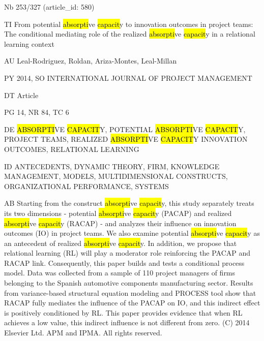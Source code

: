 \documentclass[a4paper]{article}
\begin{document}
\vspace*{-2cm}
Nb \tabto{0cm}253/327 (article\_id: 580)\par
TI \tabto{0cm}From potential \hl{absorpti}ve \hl{capacit}y to innovation outcomes in project teams: The conditional mediating role of the realized \hl{absorpti}ve \hl{capacit}y in a relational learning context\par
AU \tabto{0cm}Leal-Rodriguez, Roldan, Ariza-Montes, Leal-Millan\par
PY \tabto{0cm}2014, SO INTERNATIONAL JOURNAL OF PROJECT MANAGEMENT\par
DT \tabto{0cm}Article\par
PG \tabto{0cm}14, NR 84, TC 6\par
DE \tabto{0cm}\hl{ABSORPTI}VE \hl{CAPACIT}Y, POTENTIAL \hl{ABSORPTI}VE \hl{CAPACIT}Y, PROJECT TEAMS, REALIZED \hl{ABSORPTI}VE \hl{CAPACIT}Y INNOVATION OUTCOMES, RELATIONAL LEARNING\par
ID \tabto{0cm}ANTECEDENTS, DYNAMIC THEORY, FIRM, KNOWLEDGE MANAGEMENT, MODELS, MULTIDIMENSIONAL CONSTRUCTS, ORGANIZATIONAL PERFORMANCE, SYSTEMS\par
AB \tabto{0cm}Starting from the construct \hl{absorpti}ve \hl{capacit}y, this study separately treats its two dimensions - potential \hl{absorpti}ve \hl{capacit}y (PACAP) and realized \hl{absorpti}ve \hl{capacit}y (RACAP) - and analyzes their influence on innovation outcomes (IO) in project teams. We also examine potential \hl{absorpti}ve \hl{capacit}y as an antecedent of realized \hl{absorpti}ve \hl{capacit}y. In addition, we propose that relational learning (RL) will play a moderator role reinforcing the PACAP and RACAP link. Consequently, this paper builds and tests a conditional process model. Data was collected from a sample of 110 project managers of firms belonging to the Spanish automotive components manufacturing sector. Results from variance-based structural equation modeling and PROCESS tool show that RACAP fully mediates the influence of the PACAP on IO, and this indirect effect is positively conditioned by RL. This paper provides evidence that when RL achieves a low value, this indirect influence is not different from zero. (C) 2014 Elsevier Ltd. APM and IPMA. All rights reserved.\par
\clearpage
\end{document}

